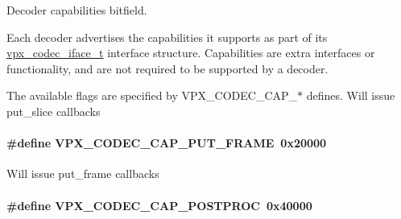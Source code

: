 \-Decoder capabilities bitfield. 

\-Each decoder advertises the capabilities it supports as part of its \hyperlink{group__codec_gad654f3da60151f5dfef70aca00ef1e9e}{vpx\-\_\-codec\-\_\-iface\-\_\-t} interface structure. \-Capabilities are extra interfaces or functionality, and are not required to be supported by a decoder.

\-The available flags are specified by \-V\-P\-X\-\_\-\-C\-O\-D\-E\-C\-\_\-\-C\-A\-P\-\_\-$\ast$ defines. \-Will issue put\-\_\-slice callbacks \hypertarget{group__decoder_ga0ef59ca8067ac1dc8c8378042277ccc8}{
\paragraph[{\-V\-P\-X\-\_\-\-C\-O\-D\-E\-C\-\_\-\-C\-A\-P\-\_\-\-P\-U\-T\-\_\-\-F\-R\-A\-M\-E}]{\setlength{\rightskip}{0pt plus 5cm}\#define \-V\-P\-X\-\_\-\-C\-O\-D\-E\-C\-\_\-\-C\-A\-P\-\_\-\-P\-U\-T\-\_\-\-F\-R\-A\-M\-E~0x20000}}
\label{group__decoder_ga0ef59ca8067ac1dc8c8378042277ccc8}
\-Will issue put\-\_\-frame callbacks \hypertarget{group__decoder_ga7825ade982ab85a5583d3d8a669baa3b}{
\paragraph[{\-V\-P\-X\-\_\-\-C\-O\-D\-E\-C\-\_\-\-C\-A\-P\-\_\-\-P\-O\-S\-T\-P\-R\-O\-C}]{\setlength{\rightskip}{0pt plus 5cm}\#define \-V\-P\-X\-\_\-\-C\-O\-D\-E\-C\-\_\-\-C\-A\-P\-\_\-\-P\-O\-S\-T\-P\-R\-O\-C~0x40000}}
\label{group__decoder_ga7825ade982ab85a5583d3d8a669baa3b}
